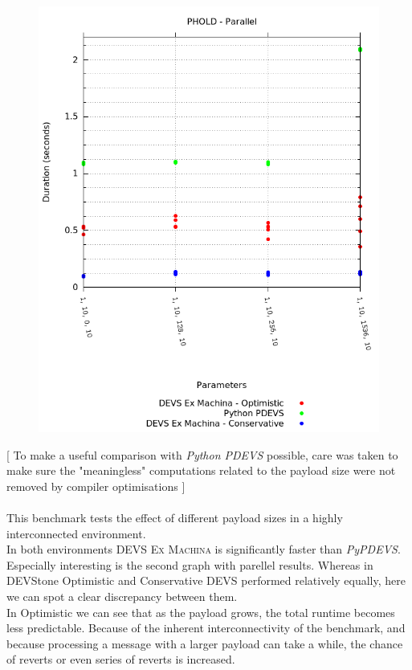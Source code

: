\documentclass[8pt,a4paper]{report}
\begin{document}
\begin{figure}
\begin{minipage}{.5\textwidth}
  \includegraphics[width=1.6\linewidth]{phold_parallel.png}
\end{minipage}
\end{figure}

{\footnotesize[ To make a useful comparison with \textit{Python PDEVS} possible, care was taken to make sure the "meaningless" computations related to the payload size were not removed by compiler optimisations ]}\\
\\
This benchmark tests the effect of different payload sizes in a highly interconnected environment.\\
In both environments \textsc{DEVS Ex Machina} is significantly faster than \textit{PyPDEVS}.
Especially interesting is the second graph with parellel results. Whereas in DEVStone Optimistic and Conservative DEVS performed relatively equally, here we can spot a clear discrepancy between them.\\

In Optimistic we can see that as the payload grows, the total runtime becomes less predictable. Because of the inherent interconnectivity of the benchmark, and because processing a message with a larger payload can take a while, the chance of reverts or even series of reverts is increased.
\end{document}
